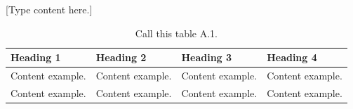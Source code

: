 

[Type content here.]

\begin{table}[htp]
    \centering
    \caption{Call this table A.1.}
    \label{tab1}
  	\begin{tabular}{|l|l|l|l|}  %
		\hline
		\bf{Heading 1} & \bf{Heading 2} & \bf{Heading 3} & \bf{Heading 4} \\ \hline
		Content example. & Content example. & Content example. & Content example. \\ \hline
		Content example. & Content example. & Content example. & Content example. \\ \hline
    \end{tabular}
\end{table}

